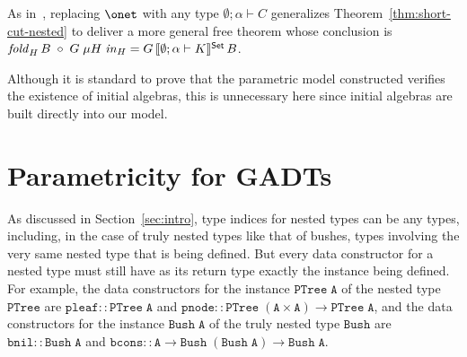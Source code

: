 \documentclass{lmcs}
\theoremstyle{plain}\newtheorem{satz}[thm]{Satz}
\begin{document}
{\vspace*{0.05in}

As in~\cite{jg10}, replacing $\onet$ with any type $\emptyset;\alpha
\vdash C$ generalizes Theorem~\ref{thm:short-cut-nested} to deliver a
more general free theorem whose conclusion is $\mathit{fold}_{H}\, B
\; \circ \; G\; \mu H \; \mathit{in}_{H} = G
\,\llbracket{\emptyset;\alpha \vdash K}\rrbracket^{\mathsf{Set}}\, B$.

\vspace*{0.05in}

Although it is standard to prove that the parametric model constructed
verifies the existence of initial algebras, this is unnecessary here
since initial algebras are built directly into our model.

\section{Parametricity for GADTs}\label{sec:GADTs}

As discussed in Section~\ref{sec:intro}, type indices for nested types
can be any types, including, in the case of truly nested types like
that of bushes, types involving the very same nested type that is
being defined. But every data constructor for a nested type must still
have as its return type exactly the instance being defined. For
example, the data constructors for the instance $\mathtt{PTree\; A}$ of the
nested type $\mathtt{PTree}$ are $\mathtt{pleaf :: PTree\; A}$ and
$\mathtt{pnode :: PTree\; (A \times A) \to PTree\; A}$, and
the data constructors for the instance $\mathtt{Bush \;A}$ of the truly
nested type $\mathtt{Bush}$ are $\mathtt{bnil :: Bush\; A}$ and
$\mathtt{bcons :: A \to Bush\; (Bush\; A) \to Bush\; A}$.

}
\end{document}
